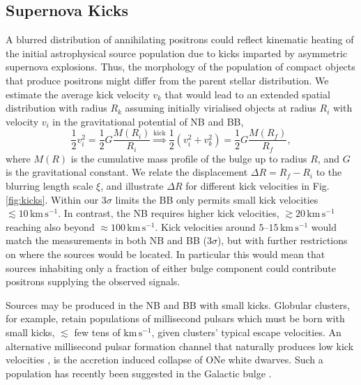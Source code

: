 \documentclass[doublespace,nopageskip]{VTthesis} %
\begin{document}
\subsection{Supernova Kicks}\label{sec:pulsar_kicks}
%
A blurred distribution of annihilating positrons could reflect kinematic heating of the initial astrophysical source population due to kicks imparted by asymmetric supernova explosions.
%
Thus, the morphology of the population of compact objects that produce positrons might differ from the parent stellar distribution.
%
We estimate the average kick velocity $v_k$ that would lead to an extended spatial distribution with radius $R_k$ assuming initially virialised objects at radius $R_i$ with velocity $v_i$ in the gravitational potential of NB and BB,
%
\begin{equation}
	\frac{1}{2}v_i^2 = \frac{1}{2} G \frac{M(R_i)}{R_i} \stackrel{\mathrm{kick}}{\Longrightarrow} \frac{1}{2}(v_i^2 + v_k^2) = \frac{1}{2} G \frac{M(R_f)}{R_f} \mathrm{,}
	\label{eq:virial_init}
\end{equation}
%
\noindent where $M(R)$ is the cumulative mass profile of the bulge up to radius $R$, and $G$ is the gravitational constant.
%
We relate the displacement $\Delta R = R_f - R_i$ to the blurring length scale $\xi$, and illustrate $\Delta R$ for different kick velocities in Fig.\,\ref{fig:kicks}.
%
Within our $3\sigma$ limits the BB only permits small kick velocities $\lesssim 10\,\mathrm{km\,s^{-1}}$.
%
In contrast, the NB requires higher kick velocities, $\gtrsim 20\,\mathrm{km\,s^{-1}}$ reaching also beyond $\approx 100\,\mathrm{km\,s^{-1}}$. 
%
Kick velocities around $5$--$15\,\mathrm{km\,s^{-1}}$ would match the measurements in both NB and BB ($3\sigma$), but with further restrictions on where the sources would be located.
%
In particular this would mean that sources inhabiting only a fraction of either bulge component could contribute positrons supplying the observed signals.
%

Sources may be produced in the NB and BB with small kicks.
%
Globular clusters, for example, retain populations of millisecond pulsars \citep{2021MNRAS.507.5161S} which must be born with small kicks, $\lesssim$ few tens of $\mathrm{km\,s^{-1}}$, given clusters' typical escape velocities.
%
An alternative millisecond pulsar formation channel 
that naturally produces low kick velocities \citep[$\lesssim 30\,\mathrm{km\,s^{-1}}$,][]{2013A&A...558A..39T}, is
the accretion induced collapse of ONe white dwarves.
%
Such a population has recently been suggested in the Galactic bulge \citep{2021arXiv210600222G}.
%
\end{document}
